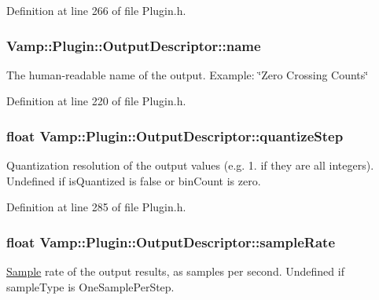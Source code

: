 Definition at line 266 of file Plugin.\+h.

\subsubsection[{\texorpdfstring{name}{name}}]{ Vamp\+::\+Plugin\+::\+Output\+Descriptor\+::name}\hypertarget{struct_vamp_1_1_plugin_1_1_output_descriptor_ab824b2b34ee50f897a30901c620e8d87}{}\label{struct_vamp_1_1_plugin_1_1_output_descriptor_ab824b2b34ee50f897a30901c620e8d87}
The human-\/readable name of the output. Example\+: \char`\"{}\+Zero Crossing Counts\char`\"{} 

Definition at line 220 of file Plugin.\+h.

\subsubsection[{\texorpdfstring{quantize\+Step}{quantizeStep}}]{\setlength{\rightskip}{0pt plus 5cm}float Vamp\+::\+Plugin\+::\+Output\+Descriptor\+::quantize\+Step}\hypertarget{struct_vamp_1_1_plugin_1_1_output_descriptor_a3bed37153067b625b95acb40b60dbf0b}{}\label{struct_vamp_1_1_plugin_1_1_output_descriptor_a3bed37153067b625b95acb40b60dbf0b}
Quantization resolution of the output values (e.\+g. 1. if they are all integers). Undefined if is\+Quantized is false or bin\+Count is zero. 

Definition at line 285 of file Plugin.\+h.

\subsubsection[{\texorpdfstring{sample\+Rate}{sampleRate}}]{\setlength{\rightskip}{0pt plus 5cm}float Vamp\+::\+Plugin\+::\+Output\+Descriptor\+::sample\+Rate}\hypertarget{struct_vamp_1_1_plugin_1_1_output_descriptor_add0cbbdfa9c91764037c39365b1d42af}{}\label{struct_vamp_1_1_plugin_1_1_output_descriptor_add0cbbdfa9c91764037c39365b1d42af}
\hyperlink{struct_sample}{Sample} rate of the output results, as samples per second. Undefined if sample\+Type is One\+Sample\+Per\+Step.

